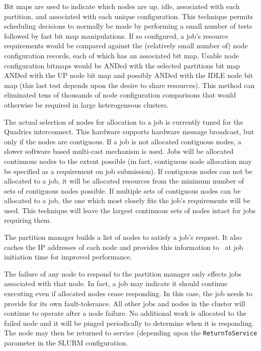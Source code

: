 Bit maps are used to indicate which nodes are up, idle, associated
with each partition, and associated with each unique configuration.
This technique permits scheduling decisions to normally be made by
performing a small number of tests followed by fast bit map manipulations. 
If so configured, a job's resource requirements would be compared 
against the (relatively small number of) node configuration records, each of 
which has an associated bit map. Usable node configuration bitmaps 
would be ANDed with the selected partitions bit map ANDed with the 
UP node bit map and possibly ANDed with the IDLE node bit map (this
last test depends upon the desire to share resources). 
This method can eliminated tens of thousands of node configuration 
comparisons that would otherwise be required in large heterogeneous 
clusters.

The actual selection of nodes for allocation to a job is currently
tuned for the Quadrics interconnect.  This hardware supports hardware
message broadcast, but only if the nodes are contiguous.  If a job
is not allocated contiguous nodes, a slower software based multi-cast
mechanism is used.  Jobs will be allocated continuous nodes to the
extent possible (in fact, contiguous node allocation may be specified 
as a requirement on job submission). 
If contiguous nodes can not be allocated to a job, it will be allocated 
resources from the minimum number of sets of contiguous nodes possible.  
If multiple sets of contiguous nodes can be allocated to a job, the one 
which most closely fits the job's requirements will be used.  
This technique will leave the largest continuous sets of nodes intact 
for jobs requiring them.

The partition manager builds a list of nodes to satisfy a job's
request.  It also caches the IP addresses of
each node and provides this information to \srun\ at job initiation
time for improved performance.

The failure of any node to respond to the partition manager only
effects jobs associated with that node.  
In fact, a job may indicate it should continue executing even if 
allocated nodes cease responding.
In this case, the job needs to provide for its own fault-tolerance.
All other jobs and nodes in the cluster will continue to operate after
a node failure.  No additional work is allocated to the failed
node and it will be pinged periodically to determine when it is 
responding. The node may then be returned to service (depending 
upon the {\tt ReturnToService} parameter in the SLURM configuration. 

